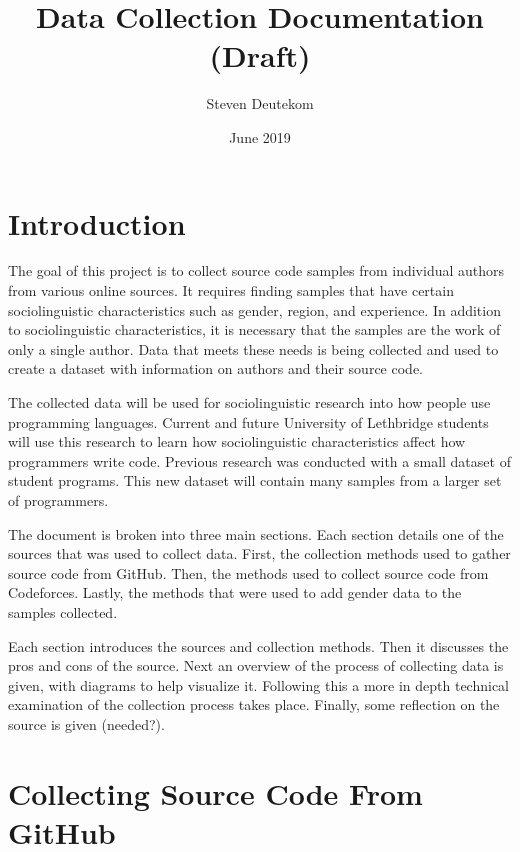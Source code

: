 \documentclass{article}
\begin{document}
\title{Data Collection Documentation (Draft)}
\author{Steven Deutekom}
\date{June 2019}
\maketitle


\newpage
\tableofcontents


\newpage
\section{Introduction}
The goal of this project is to collect source code samples from individual authors from various online sources. It requires finding samples that have certain sociolinguistic characteristics such as gender, region, and experience. In addition to sociolinguistic characteristics, it is necessary that the samples are the work of only a single author. Data that meets these needs is being collected and used to create a dataset with information on authors and their source code.

The collected data will be used for sociolinguistic research into how people use programming languages. Current and future University of Lethbridge students will use this research to learn how sociolinguistic characteristics affect how programmers write code. Previous research was conducted with a small dataset of student programs. This new dataset will contain many samples from a larger set of programmers.

The document is broken into three main sections. Each section details one of the sources that was used to collect data. First, the collection methods used to gather source code from GitHub. Then, the methods used to collect source code from Codeforces. Lastly, the methods that were used to add gender data to the samples collected.

Each section introduces the sources and collection methods. Then it discusses the pros and cons of the source. Next an overview of the process of collecting data is given, with diagrams to help visualize it. Following this a more in depth technical examination of the collection process takes place. Finally, some reflection on the source is given (needed?).


\section{Collecting Source Code From GitHub}
\end{document}
